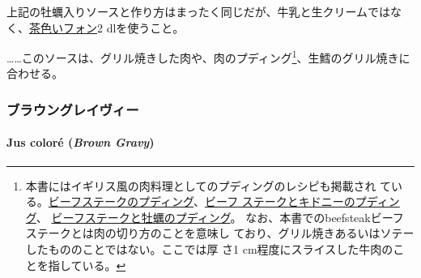 \begin{recette}
上記の牡蠣入りソースと作り方はまったく同じだが、牛乳と生クリームではな
く、\protect\hyperlink{fonds-brun}{茶色いフォン}2 dlを使うこと。

\ldots{}\ldots{}このソースは、グリル焼きした肉や、肉のプディング\footnote{本書にはイギリス風の肉料理としてのプディングのレシピも掲載され
  ている。\protect\hyperlink{beefsteak-pudding}{ビーフステークのプディング}、\protect\hyperlink{beefsteak-and-kidney-pudding}{ビーフ
  ステークとキドニーのプディング}、
  \protect\hyperlink{beefsteak-and-oysters-pudding}{ビーフステークと牡蠣のプディング}。
  なお、本書でのbeefsteakビーフステークとは肉の切り方のことを意味し
  ており、グリル焼きあるいはソテーしたもののことではない。ここでは厚 さ1
  cm程度にスライスした牛肉のことを指している。}、生鱈のグリル焼きに合わせる。

\maeaki

\hypertarget{ux30d6ux30e9ux30a6ux30f3ux30b0ux30ecux30a4ux30f4ux30a3ux30fc}{%
\subsubsection{ブラウングレイヴィー}\label{ux30d6ux30e9ux30a6ux30f3ux30b0ux30ecux30a4ux30f4ux30a3ux30fc}}

\hypertarget{brown-graby}{%
\paragraph{\texorpdfstring{Jus coloré (\emph{Brown
Gravy})}{Jus coloré (Brown Gravy)}}\label{brown-graby}}



\end{recette}
